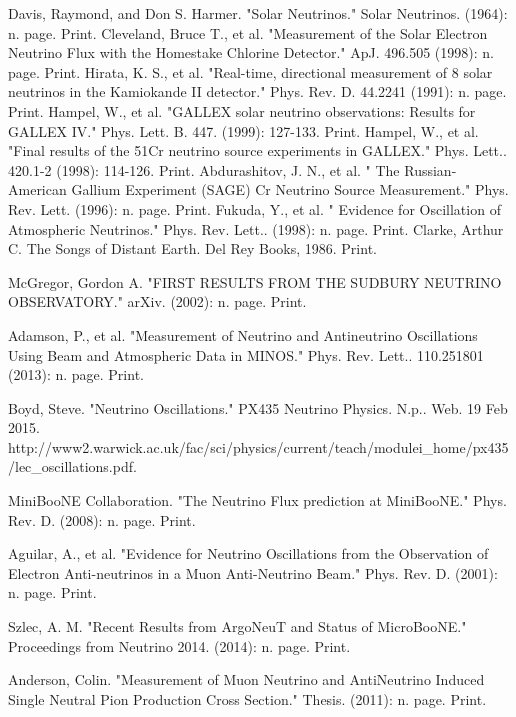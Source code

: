 \documentclass[12pt]{article}
\begin{document}
\newpage
\begin{thebibliography}{20} %
Davis, Raymond, and Don S. Harmer. "Solar Neutrinos." Solar Neutrinos. (1964): n. page. Print.
Cleveland, Bruce T., et al. "Measurement of the Solar Electron Neutrino Flux with the Homestake Chlorine Detector." ApJ. 496.505 (1998): n. page. Print.
Hirata, K. S., et al. "Real-time, directional measurement of 8 solar neutrinos in the Kamiokande II detector." Phys. Rev. D. 44.2241 (1991): n. page. Print.
Hampel, W., et al. "GALLEX solar neutrino observations: Results for GALLEX IV." Phys. Lett. B. 447. (1999): 127-133. Print.
Hampel, W., et al. "Final results of the 51Cr neutrino source experiments in GALLEX." Phys. Lett.. 420.1-2 (1998): 114-126. Print.
Abdurashitov, J. N., et al. " The Russian-American Gallium Experiment (SAGE) Cr Neutrino Source Measurement."  Phys. Rev. Lett. (1996): n. page. Print.
Fukuda, Y., et al. " Evidence for Oscillation of Atmospheric Neutrinos."  Phys. Rev. Lett.. (1998): n. page. Print.
Clarke, Arthur C. The Songs of Distant Earth. Del Rey Books, 1986. Print.

McGregor, Gordon A. "FIRST RESULTS FROM THE SUDBURY NEUTRINO OBSERVATORY." arXiv. (2002): n. page. Print.

Adamson, P., et al. "Measurement of Neutrino and Antineutrino Oscillations Using Beam and Atmospheric Data in MINOS."  Phys. Rev. Lett.. 110.251801 (2013): n. page. Print.

Boyd, Steve. "Neutrino Oscillations." PX435 Neutrino Physics. N.p.. Web. 19 Feb 2015. http://www2.warwick.ac.uk/fac/sci/physics/current/teach/modulei\_home/px435/lec\_oscillations.pdf.

MiniBooNE Collaboration. "The Neutrino Flux prediction at MiniBooNE." Phys. Rev. D. (2008): n. page. Print.

Aguilar, A., et al. "Evidence for Neutrino Oscillations from the Observation of Electron Anti-neutrinos in a Muon Anti-Neutrino Beam." Phys. Rev. D. (2001): n. page. Print.

Szlec, A. M. "Recent Results from ArgoNeuT and Status of MicroBooNE." Proceedings from Neutrino 2014. (2014): n. page. Print.

Anderson, Colin. "Measurement of Muon Neutrino and AntiNeutrino Induced Single Neutral Pion Production Cross Section." Thesis. (2011): n. page. Print.


\end{thebibliography}
\end{document}
